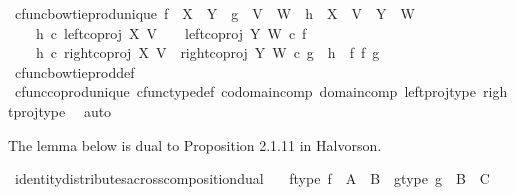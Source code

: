 \begin{isabellebody}
\endisatagproof
{\isafoldproof}%
%
\isadelimproof
\isanewline
%
\endisadelimproof
\isanewline
{}\isamarkupfalse%
\ cfunc{\isacharunderscore}{\kern0pt}bowtie{\isacharunderscore}{\kern0pt}prod{\isacharunderscore}{\kern0pt}unique{\isacharcolon}{\kern0pt}\ {\isachardoublequoteopen}f\ {\isacharcolon}{\kern0pt}\ X\ {\isasymrightarrow}\ Y\ {\isasymLongrightarrow}\ g\ {\isacharcolon}{\kern0pt}\ V\ {\isasymrightarrow}\ W\ {\isasymLongrightarrow}\ h\ {\isacharcolon}{\kern0pt}\ X\ {\isasymCoprod}\ V\ {\isasymrightarrow}\ Y\ {\isasymCoprod}\ W\ {\isasymLongrightarrow}\isanewline
\ \ \ \ h\ {\isasymcirc}\isactrlsub c\ left{\isacharunderscore}{\kern0pt}coproj\ X\ V\ \ \ {\isacharequal}{\kern0pt}\ left{\isacharunderscore}{\kern0pt}coproj\ Y\ W\ {\isasymcirc}\isactrlsub c\ f\ {\isasymLongrightarrow}\isanewline
\ \ \ \ h\ {\isasymcirc}\isactrlsub c\ right{\isacharunderscore}{\kern0pt}coproj\ X\ V\ {\isacharequal}{\kern0pt}\ right{\isacharunderscore}{\kern0pt}coproj\ Y\ W\ {\isasymcirc}\isactrlsub c\ g\ {\isasymLongrightarrow}\ h\ {\isacharequal}{\kern0pt}\ f\ {\isasymbowtie}\isactrlsub f\ g{\isachardoublequoteclose}\isanewline
%
\isadelimproof
\ \ %
\endisadelimproof
%
\isatagproof
{}\isamarkupfalse%
\ cfunc{\isacharunderscore}{\kern0pt}bowtie{\isacharunderscore}{\kern0pt}prod{\isacharunderscore}{\kern0pt}def\isanewline
\ \ \isamarkupfalse%
\ cfunc{\isacharunderscore}{\kern0pt}coprod{\isacharunderscore}{\kern0pt}unique\ cfunc{\isacharunderscore}{\kern0pt}type{\isacharunderscore}{\kern0pt}def\ codomain{\isacharunderscore}{\kern0pt}comp\ domain{\isacharunderscore}{\kern0pt}comp\ left{\isacharunderscore}{\kern0pt}proj{\isacharunderscore}{\kern0pt}type\ right{\isacharunderscore}{\kern0pt}proj{\isacharunderscore}{\kern0pt}type\ \isamarkupfalse%
\ auto%
\endisatagproof
{\isafoldproof}%
%
\isadelimproof
%
\endisadelimproof
%
\begin{isamarkuptext}%
The lemma below is dual to Proposition 2.1.11 in Halvorson.%
\end{isamarkuptext}\isamarkuptrue%
\isamarkupfalse%
\ identity{\isacharunderscore}{\kern0pt}distributes{\isacharunderscore}{\kern0pt}across{\isacharunderscore}{\kern0pt}composition{\isacharunderscore}{\kern0pt}dual{\isacharcolon}{\kern0pt}\isanewline
\ \ \ f{\isacharunderscore}{\kern0pt}type{\isacharcolon}{\kern0pt}\ {\isachardoublequoteopen}f\ {\isacharcolon}{\kern0pt}\ A\ {\isasymrightarrow}\ B{\isachardoublequoteclose}\ \ g{\isacharunderscore}{\kern0pt}type{\isacharcolon}{\kern0pt}\ {\isachardoublequoteopen}g\ {\isacharcolon}{\kern0pt}\ B\ {\isasymrightarrow}\ C{\isachardoublequoteclose}\isanewline

\end{isabellebody}
